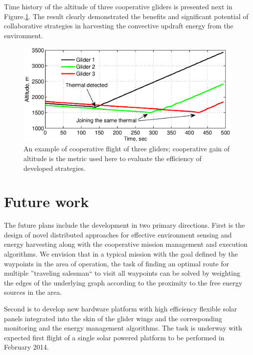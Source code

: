 \documentclass{ifacconf}
\begin{document}
Time history of the altitude of three cooperative gliders is presented next in Figure.\ref{fig:CoopFlightHeight}. The result clearly demonstrated the benefits and significant potential of collaborative strategies in harvesting the convective updraft energy from the environment.

\begin{figure}[thpb]
  \centering
  \includegraphics[scale=0.5]{Figures/Coop_gain_altitude.eps}
  \caption{An example of cooperative flight of three gliders; cooperative gain of altitude is the metric used here to evaluate the efficiency of developed strategies.}
  \label{fig:CoopFlightHeight}
\end{figure}

\section{Future work}
\label{sec:Future}
The future plans include the development in two primary directions. First is the design of novel distributed approaches for effective environment sensing and energy harvesting along with the cooperative mission management and execution algorithms. We envision that in a typical mission with the goal defined by the waypoints in the area of operation, the task of finding an optimal route for multiple ''traveling salesman`` to visit all waypoints can be solved by weighting the edges of the underlying graph according to the proximity to the free energy sources in the area.

Second is to develop new hardware platform with high efficiency flexible solar panels integrated into the skin of the glider wings and the corresponding monitoring and the energy management algorithms. The task is underway with expected first flight of a single solar powered platform to be performed in February 2014.

%
\end{document}
